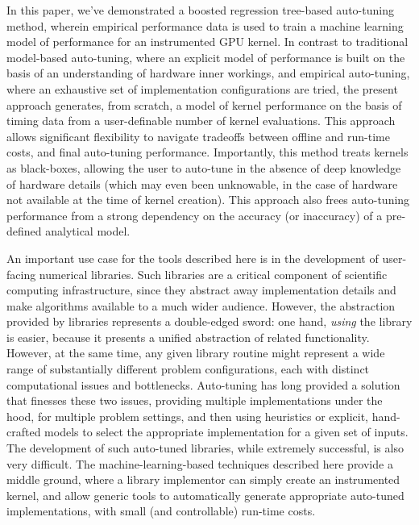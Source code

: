 \documentclass{sig-alternate}
\begin{document}
In this paper, we've demonstrated a boosted regression tree-based auto-tuning
method, wherein empirical performance data is used to train a machine learning
model of performance for an instrumented GPU kernel.  In contrast to
traditional model-based auto-tuning, where an explicit model of performance is
built on the basis of an understanding of hardware inner workings, and
empirical auto-tuning, where an exhaustive set of implementation configurations
are tried, the present approach generates, from scratch, a model of kernel
performance on the basis of timing data from a user-definable number of kernel
evaluations.  This approach allows significant flexibility to navigate
tradeoffs between offline and run-time costs, and final auto-tuning
performance.  Importantly, this method treats kernels as black-boxes, allowing
the user to auto-tune in the absence of deep knowledge of hardware details
(which may even been unknowable, in the case of hardware not available at the
time of kernel creation).  This approach also frees auto-tuning performance
from a strong dependency on the accuracy (or inaccuracy) of a pre-defined
analytical model.

An important use case for the tools described here is in the development of
user-facing numerical libraries.  Such libraries are a critical component of
scientific computing infrastructure, since they abstract away implementation
details and make algorithms available to a much wider audience.  However, the
abstraction provided by libraries represents a double-edged sword: one hand,
\emph{using} the library is easier, because it presents a unified abstraction
of related functionality.  However, at the same time, any given library routine
might represent a wide range of substantially different problem configurations,
each with distinct computational issues and bottlenecks.  Auto-tuning has long
provided a solution that finesses these two issues, providing multiple
implementations under the hood, for multiple problem settings, and then using
heuristics or explicit, hand-crafted models to select the appropriate
implementation for a given set of inputs.  The development of such auto-tuned
libraries, while extremely successful, is also very difficult.  The
machine-learning-based techniques described here provide a middle ground, where
a library implementor can simply create an instrumented kernel, and allow
generic tools to automatically generate appropriate auto-tuned implementations,
with small (and controllable) run-time costs.

\end{document}
